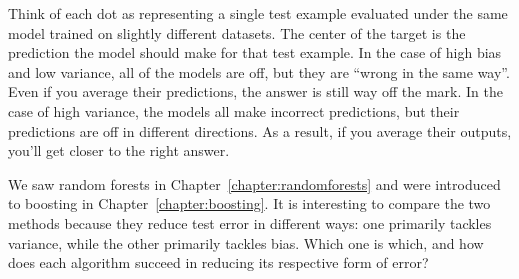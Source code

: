 Think of each dot as representing a single test example evaluated under the same model trained on slightly different datasets. The center of the target is the prediction the model should make for that test example. In the case of high bias and low variance, all of the models are off, but they are ``wrong in the same way''. Even if you average their predictions, the answer is still way off the mark. In the case of high variance, the models all make incorrect predictions, but their predictions are off in different directions. As a result, if you average their outputs, you'll get closer to the right answer. 

\vspace{2mm}

\begin{question}{}
We saw random forests in Chapter~\ref{chapter:randomforests} and were introduced to boosting in Chapter~\ref{chapter:boosting}. It is interesting to compare the two methods because they reduce test error in different ways: one primarily tackles variance, while the other primarily tackles bias. Which one is which, and how does each algorithm succeed in reducing its respective form of error? 
\end{question}
